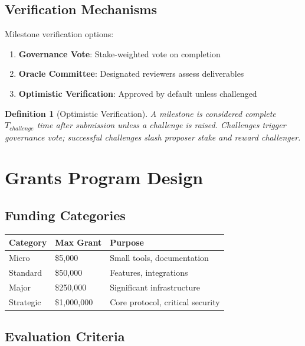 \documentclass[11pt,a4paper]{article}
\newtheorem{definition}{Definition}
\begin{document}
\subsection{Verification Mechanisms}

Milestone verification options:

\begin{enumerate}
    \item \textbf{Governance Vote}: Stake-weighted vote on completion
    \item \textbf{Oracle Committee}: Designated reviewers assess deliverables
    \item \textbf{Optimistic Verification}: Approved by default unless challenged
\end{enumerate}

\begin{definition}[Optimistic Verification]
A milestone is considered complete $T_{challenge}$ time after submission unless a challenge is raised. Challenges trigger governance vote; successful challenges slash proposer stake and reward challenger.
\end{definition}

\section{Grants Program Design}

\subsection{Funding Categories}

\begin{center}
\begin{tabular}{lll}
\toprule
Category & Max Grant & Purpose \\
\midrule
Micro & \$5,000 & Small tools, documentation \\
Standard & \$50,000 & Features, integrations \\
Major & \$250,000 & Significant infrastructure \\
Strategic & \$1,000,000 & Core protocol, critical security \\
\bottomrule
\end{tabular}
\end{center}

\subsection{Evaluation Criteria}
\end{document}
